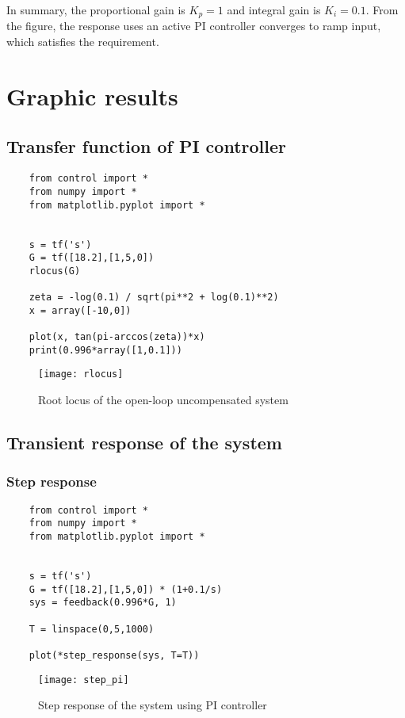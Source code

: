 In summary, the proportional gain is $ K_p = 1 $ and integral gain is $ K_i = 0.1 $. From the figure, the response uses an active PI controller converges to ramp input, which satisfies the requirement.

\section{Graphic results}
\subsection{Transfer function of PI controller}
\begin{verbatim}
	from control import *
	from numpy import *
	from matplotlib.pyplot import *
	
	
	s = tf('s')
	G = tf([18.2],[1,5,0])
	rlocus(G)
	
	zeta = -log(0.1) / sqrt(pi**2 + log(0.1)**2)
	x = array([-10,0])
	
	plot(x, tan(pi-arccos(zeta))*x)
	print(0.996*array([1,0.1]))
\end{verbatim}
\begin{figure}[ht]
	\centering
	\texttt{[image: rlocus]}
	\caption{Root locus of the open-loop uncompensated system}
\end{figure}


\subsection{Transient response of the system}
\subsubsection{Step response}
\begin{verbatim}
	from control import *
	from numpy import *
	from matplotlib.pyplot import *
	
	
	s = tf('s')
	G = tf([18.2],[1,5,0]) * (1+0.1/s)
	sys = feedback(0.996*G, 1)
	
	T = linspace(0,5,1000)
	
	plot(*step_response(sys, T=T))
\end{verbatim}
\begin{figure}[ht]
	\centering
	\texttt{[image: step\_pi]}
	\caption{Step response of the system using PI controller}
\end{figure}

